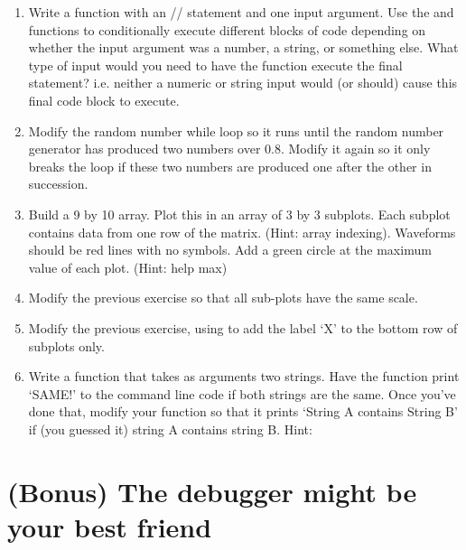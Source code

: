 \documentclass{article}
\begin{document}
\begin{enumerate}
\item Write a function with an // statement and one input argument. Use the  and  functions to conditionally execute different blocks of code depending on whether the input argument was a number, a string, or something else. What type of input would you need to have the function execute the final  statement? i.e. neither a numeric or string input would (or should) cause this final code block to execute.

\item Modify the random number while loop so it runs until the random number generator has produced two numbers over 0.8. Modify it again so it only breaks the loop if these two numbers are produced one after the other in succession.

\item Build a 9 by 10 array. Plot this in an array of 3 by 3 subplots. Each subplot contains data from one row of the matrix. (Hint: array indexing). Waveforms should be red lines with no symbols. Add a green circle at the maximum value of each plot. (Hint: help max)

\item Modify the previous exercise so that all sub-plots have the same scale.

\item Modify the previous exercise, using  to add the label `X' to the bottom row of subplots only.

\item Write a function that takes as arguments two strings. Have the function print `SAME!' to the command line code if both strings are the same. Once you've done that,  modify your function so that it prints `String A contains String B' if (you guessed it) string A contains string B. Hint: 

\end{enumerate}

\section{(Bonus) The debugger might be your best friend}
\end{document}
